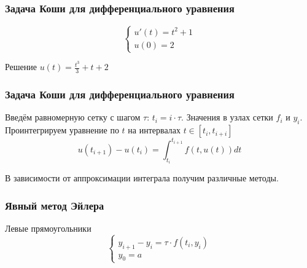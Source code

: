 \documentclass[10pt]{beamer}
\begin{document}
\begin{frame}[fragile]
\frametitle{Задача Коши для дифференциального уравнения}

$$
\begin{cases}
u'(t) = t^2 + 1 \\
u(0) = 2
\end{cases}
$$

\vfill

\begin{center}
\end{center}

Решение $u(t) = \frac{t^3}{3} + t + 2$
\end{frame}

\begin{frame}[fragile]
\frametitle{Задача Коши для дифференциального уравнения}


Введём равномерную сетку с шагом $\tau$: $t_i = i \cdot \tau$. Значения в узлах сетки $f_i$ и $y_i$. Проинтегрируем уравнение по $t$ на интервалах $t \in [t_i, t_{i+i}]$
$$ 
u(t_{i+1}) - u(t_i) = \int_{t_i}^{t_{i+1}} f(t, u(t)) dt
$$

В зависимости от аппроксимации интеграла получим различные методы.
\end{frame}


\begin{frame}[fragile]
\frametitle{Явный метод Эйлера}

Левые прямоугольники
$$
\begin{cases}
y_{i + 1} - y_i = \tau \cdot f(t_i, y_i) \\
y_0 = a
\end{cases}
$$

\begin{center}
\end{center}
\end{frame}
\end{document}
